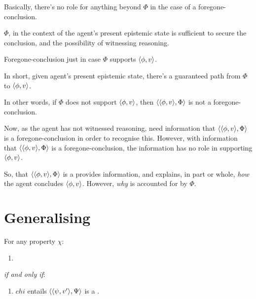 \begin{note}[Trimming]
  \begin{proposition}
    Basically, there's no role for anything beyond \(\Phi\) in the case of a foregone-conclusion.

    \(\Phi\), in the context of the agent's present epistemic state is sufficient to secure the conclusion, and the possibility of witnessing reasoning.
  \end{proposition}

  \begin{proposition}
    Foregone-conclusion just in case \(\Phi\) supports \(\langle \phi, v \rangle\).
    \begin{argument}
      In short, given agent's present epistemic state, there's a guaranteed path from \(\Phi\) to \(\langle \phi, v \rangle\).
    \end{argument}
    In other words, if \(\Phi\) does not support \(\langle \phi, v \rangle\), then \(\langle \langle \phi, v \rangle, \Phi \rangle\) is not a foregone-conclusion.
  \end{proposition}

  Now, as the agent has not witnessed reasoning, need information that \(\langle \langle \phi, v \rangle, \Phi \rangle\) is a foregone-conclusion in order to recognise this.
  However, with information that \(\langle \langle \phi, v \rangle, \Phi \rangle\) is a foregone-conclusion, the information has no role in supporting \(\langle \phi, v \rangle\).
\end{note}

\begin{note}
  So, that \(\langle \langle \phi, v \rangle, \Phi \rangle\) is a  provides information, and explains, in part or whole, \emph{how} the agent concludes \(\langle \phi, v \rangle\).
  However, \emph{why} is accounted for by \(\Phi\).
\end{note}


\section{Generalising}
\label{cha:fcs:sec:generalising}

\begin{note}
  \begin{proposition}
    \label{prop:qzs-tick-equals-iCS:var}
    For any property \(\chi\):
    \begin{enumerate}[label=\Alph*.]
    \item
      \label{squish:A}
    \end{enumerate}
    \emph{if and only if}:
    \begin{enumerate}[label=\Alph*.,resume]
    \item
      \label{squish:B}
      \(chi\) entails \(\langle \langle \psi, v' \rangle, \Psi \rangle\) is a \fc{}.
    \end{enumerate}
    \vspace{-\baselineskip}
  \end{proposition}
\end{note}

